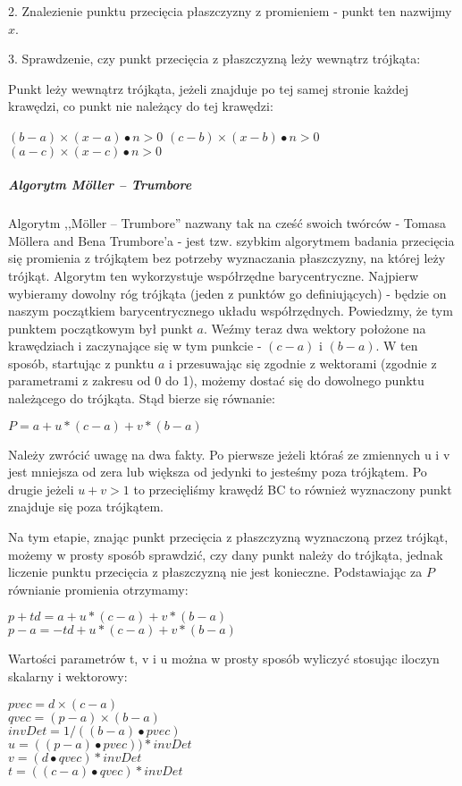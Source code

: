 2. Znalezienie punktu przecięcia płaszczyzny z promieniem - punkt ten nazwijmy $x$.

3. Sprawdzenie, czy punkt przecięcia z płaszczyzną leży wewnątrz trójkąta:

Punkt leży wewnątrz trójkąta, jeżeli znajduje po tej samej stronie każdej krawędzi, co punkt nie należący do tej krawędzi:

$(b - a) \times (x - a) \bullet n > 0$
$(c - b) \times (x - b) \bullet n > 0$
$(a - c) \times (x - c) \bullet n > 0$

\subparagraph{Algorytm Möller – Trumbore}

Algorytm ,,Möller – Trumbore'' nazwany tak na cześć swoich twórców - Tomasa Möllera and Bena Trumbore'a - jest tzw. szybkim algorytmem badania przecięcia się promienia z trójkątem bez potrzeby wyznaczania płaszczyzny, na której leży trójkąt. Algorytm ten wykorzystuje współrzędne barycentryczne. Najpierw wybieramy dowolny róg trójkąta (jeden z punktów go definiujących) - będzie on naszym początkiem barycentrycznego układu współrzędnych. Powiedzmy, że tym punktem początkowym był punkt $a$. Weźmy teraz dwa wektory położone na krawędziach i zaczynające się w tym punkcie - $(c - a)$ i $(b - a)$. W ten sposób, startując z punktu $a$ i przesuwając się zgodnie z wektorami (zgodnie z parametrami z zakresu od 0 do 1), możemy dostać się do dowolnego punktu należącego do trójkąta. Stąd bierze się równanie:

$P = a + u * (c - a) + v * (b - a)$

Należy zwrócić uwagę na dwa fakty. Po pierwsze jeżeli któraś ze zmiennych u i v jest mniejsza od zera lub większa od jedynki to jesteśmy poza trójkątem. Po drugie jeżeli $u + v > 1$ to przecięliśmy krawędź BC to również wyznaczony punkt znajduje się poza trójkątem.


Na tym etapie, znając punkt przecięcia z płaszczyzną wyznaczoną przez trójkąt, możemy w prosty sposób sprawdzić, czy dany punkt należy do trójkąta, jednak liczenie punktu przecięcia z płaszczyzną nie jest konieczne. Podstawiając za $P$ równianie promienia otrzymamy:

$p + td = a + u * (c - a) + v * (b - a)$
$p - a = -td + u * (c - a) + v * (b - a)$

Wartości parametrów t, v i u można w prosty sposób wyliczyć stosując iloczyn skalarny i wektorowy:

$pvec = d \times (c - a)$ \\
$qvec = (p - a) \times (b - a)$ \\
$invDet = 1/((b - a) \bullet pvec)$ \\
$u = ((p - a) \bullet pvec)) * invDet$ \\
$v = (d \bullet qvec) * invDet$ \\
$t = ((c - a) \bullet qvec) * invDet$ \\ 

